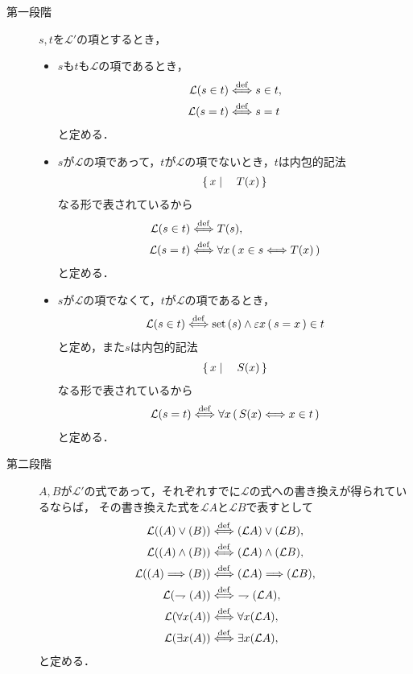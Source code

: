	\begin{description}
		\item[第一段階] $s,t$を$\mathcal{L}'$の項とするとき，
			\begin{itemize}
				\item $s$も$t$も$\mathcal{L}$の項であるとき，
					\begin{align}
						\mathcal{L}(s \in t) &\overset{\mathrm{def}}{\Longleftrightarrow} s \in t, \\
						\mathcal{L}(s = t) &\overset{\mathrm{def}}{\Longleftrightarrow} s = t
					\end{align}
					と定める．
					
				\item $s$が$\mathcal{L}$の項であって，$t$が$\mathcal{L}$の項でないとき，$t$は内包的記法
					\begin{align}
						\left\{\, x \mid \quad T(x)\, \right\}
					\end{align}
					なる形で表されているから
					\begin{align}
						\mathcal{L}(s \in t) &\overset{\mathrm{def}}{\Longleftrightarrow} T(s), \\
						\mathcal{L}(s = t) &\overset{\mathrm{def}}{\Longleftrightarrow} \forall x\, (\, x \in s \Longleftrightarrow T(x)\, )
					\end{align}
					と定める．
					
				\item $s$が$\mathcal{L}$の項でなくて，$t$が$\mathcal{L}$の項であるとき，
					\begin{align}
						\mathcal{L}(s \in t) \overset{\mathrm{def}}{\Longleftrightarrow} \operatorname*{set} \left(s\right) \wedge \varepsilon x\, (\, s = x\, ) \in t
					\end{align}
					と定め，また$s$は内包的記法
					\begin{align}
						\left\{\, x \mid \quad S(x)\, \right\}
					\end{align}
					なる形で表されているから
					\begin{align}
						\mathcal{L}(s = t) \overset{\mathrm{def}}{\Longleftrightarrow} \forall x\, (\, S(x) \Longleftrightarrow x \in t\, )
					\end{align}
					と定める．
			\end{itemize}
		
		\item[第二段階] $A,B$が$\mathcal{L}'$の式であって，それぞれすでに$\mathcal{L}$の式への書き換えが得られているならば，
			その書き換えた式を$\mathcal{L}A$と$\mathcal{L}B$で表すとして
			\begin{align}
				\mathcal{L}((A) \vee (B)) &\defarrow (\mathcal{L}A) \vee (\mathcal{L}B), \\
				\mathcal{L}((A) \wedge (B)) &\defarrow (\mathcal{L}A) \wedge (\mathcal{L}B), \\
				\mathcal{L}((A) \Longrightarrow (B)) &\defarrow (\mathcal{L}A) \Longrightarrow (\mathcal{L}B), \\
				\mathcal{L}(\rightharpoondown (A)) &\defarrow\ \rightharpoondown (\mathcal{L}A), \\
				\mathcal{L}(\forall x (A)) &\defarrow \forall x (\mathcal{L}A), \\
				\mathcal{L}(\exists x (A)) &\defarrow \exists x (\mathcal{L}A), \\
			\end{align}
			と定める．
	\end{description}
	
